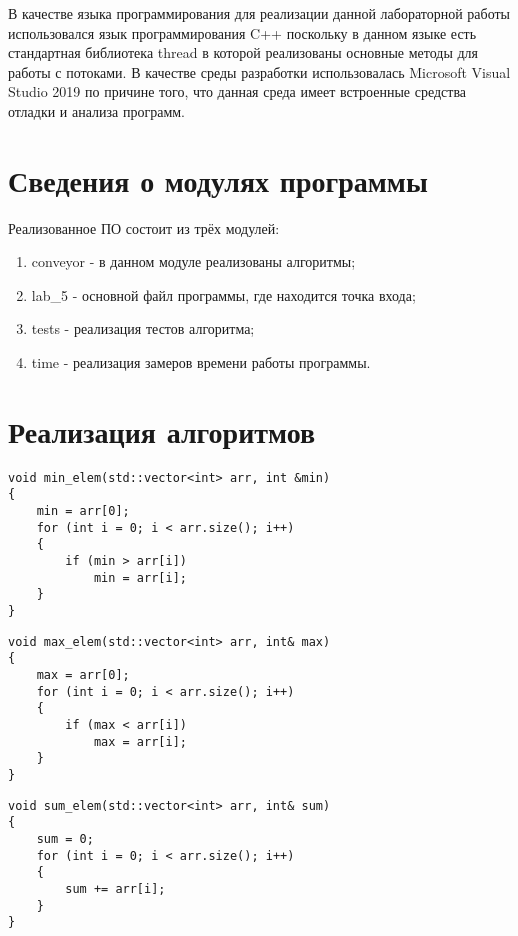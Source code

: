 В качестве языка программирования для реализации данной лабораторной работы использовался язык программирования C++ поскольку в данном языке есть стандартная библиотека thread в которой реализованы основные методы для работы с потоками. В качестве среды разработки использовалась Microsoft Visual Studio 2019 по причине того, что данная среда имеет встроенные средства отладки и анализа программ.

\section{Сведения о модулях программы}

Реализованное ПО состоит из трёх модулей:
\begin{enumerate}
	\item conveyor - в данном модуле реализованы алгоритмы;
	\item lab\_5 - основной файл программы, где находится точка входа;
	\item tests - реализация тестов алгоритма;
	\item time - реализация замеров времени работы программы.
\end{enumerate}

\section{Реализация алгоритмов}

\begin{lstlisting}[label=some-code-1,caption=Реализация алгоритма поиска минимума]
void min_elem(std::vector<int> arr, int &min)
{
	min = arr[0];
	for (int i = 0; i < arr.size(); i++)
	{
		if (min > arr[i])
			min = arr[i];
	}
}
\end{lstlisting}

\begin{lstlisting}[label=some-code-2,caption=Реализация алгоритма поиска максимума]
void max_elem(std::vector<int> arr, int& max)
{
	max = arr[0];
	for (int i = 0; i < arr.size(); i++)
	{
		if (max < arr[i])
			max = arr[i];
	}
}
\end{lstlisting}

\begin{lstlisting}[label=some-code-3,caption=Реализация алгоритма поиска суммы всех элементов]
void sum_elem(std::vector<int> arr, int& sum)
{
	sum = 0;
	for (int i = 0; i < arr.size(); i++)
	{
		sum += arr[i];
	}
}

\end{lstlisting}

